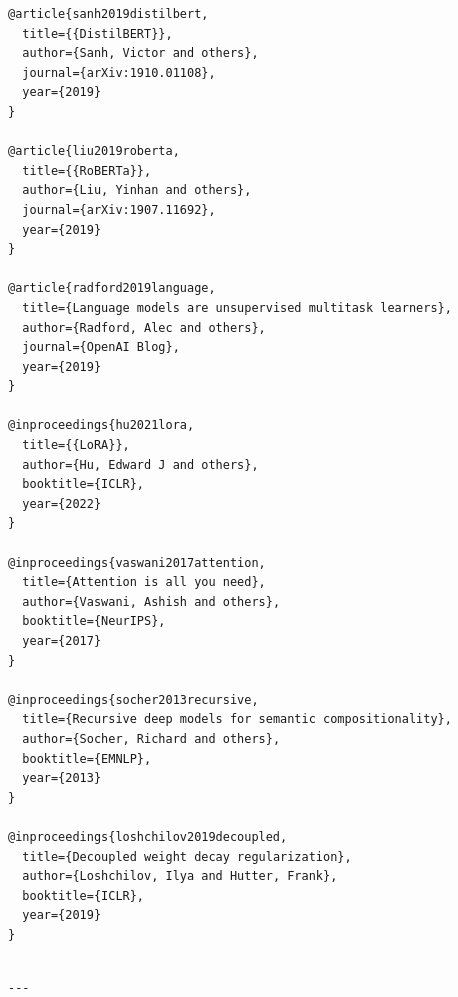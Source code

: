 \begin{lstlisting}
@article{sanh2019distilbert,
  title={{DistilBERT}},
  author={Sanh, Victor and others},
  journal={arXiv:1910.01108},
  year={2019}
}

@article{liu2019roberta,
  title={{RoBERTa}},
  author={Liu, Yinhan and others},
  journal={arXiv:1907.11692},
  year={2019}
}

@article{radford2019language,
  title={Language models are unsupervised multitask learners},
  author={Radford, Alec and others},
  journal={OpenAI Blog},
  year={2019}
}

@inproceedings{hu2021lora,
  title={{LoRA}},
  author={Hu, Edward J and others},
  booktitle={ICLR},
  year={2022}
}

@inproceedings{vaswani2017attention,
  title={Attention is all you need},
  author={Vaswani, Ashish and others},
  booktitle={NeurIPS},
  year={2017}
}

@inproceedings{socher2013recursive,
  title={Recursive deep models for semantic compositionality},
  author={Socher, Richard and others},
  booktitle={EMNLP},
  year={2013}
}

@inproceedings{loshchilov2019decoupled,
  title={Decoupled weight decay regularization},
  author={Loshchilov, Ilya and Hutter, Frank},
  booktitle={ICLR},
  year={2019}
}
\end{lstlisting}
\begin{lstlisting}

---
\end{lstlisting}